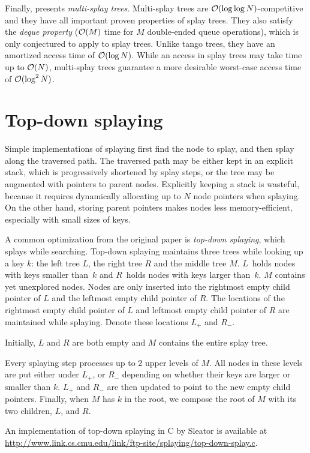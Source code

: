Finally, \cite{multisplay-trees} presents \emph{multi-splay trees}.
Multi-splay trees are $\mathcal{O}(\log\log N)$-competitive and they have all important
proven properties of splay trees. They also satisfy the \emph{deque property}
($\mathcal{O}(M)$ time for $M$ double-ended queue operations), which is only conjectured
to apply to splay trees.
Unlike tango trees, they have an amortized access time of $\mathcal{O}(\log N)$.
While an access in splay trees may take time up to $\mathcal{O}(N)$, multi-splay trees
guarantee a more desirable worst-case access time of $\mathcal{O}(\log^2 N)$.

\section{Top-down splaying}
Simple implementations of splaying first find the node to splay, and then
splay along the traversed path. The traversed path may be either kept
in an explicit stack, which is progressively shortened by splay steps,
or the tree may be augmented with pointers to parent nodes.
Explicitly keeping a stack is wasteful, because it requires dynamically
allocating up to $N$ node pointers when splaying. On the other hand,
storing parent pointers makes nodes less memory-efficient, especially
with small sizes of keys.

A common optimization from the original paper \cite{splay} is
\emph{top-down splaying}, which splays while searching.
Top-down splaying maintains three trees while looking up a key $k$:
the left tree $L$, the right tree $R$ and the middle tree $M$.
$L$~holds nodes with keys smaller than~$k$ and $R$~holds nodes with keys
larger than~$k$. $M$ contains yet unexplored nodes.
Nodes are only inserted into the rightmost empty child pointer of $L$
and the leftmost empty child pointer of $R$. The locations of the rightmost
empty child pointer of $L$ and leftmost empty child pointer of $R$ are
maintained while splaying. Denote these locations $L_+$ and $R_-$.

Initially, $L$ and $R$ are both empty and $M$ contains the entire splay tree.

Every splaying step processes up to 2 upper levels of $M$. All nodes in these
levels are put either under $L_+$, or $R_-$ depending on whether their keys
are larger or smaller than $k$. $L_+$ and $R_-$ are then updated to point
to the new empty child pointers.
Finally, when $M$ has $k$ in the root, we compose the root of $M$ with its
two children, $L$, and $R$.

An implementation of top-down splaying in C by Sleator is available
at \url{http://www.link.cs.cmu.edu/link/ftp-site/splaying/top-down-splay.c}.

